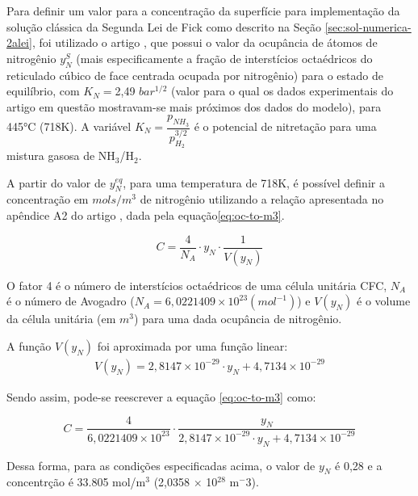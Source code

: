 Para definir um valor para a concentração da superfície para implementação da solução clássica da Segunda Lei de Fick como descrito na Seção \autoref{sec:sol-numerica-2alei}, foi utilizado o artigo  \cite{christiansen2008nitrogen}, que possui o valor da ocupância de átomos de nitrogênio $y_N^{S}$ (mais especificamente a fração de interstícios octaédricos do reticulado cúbico de face centrada ocupada por nitrogênio) para o estado de equilíbrio, com $K_N=$2,49 $bar^{1/2}$ (valor para o qual os dados experimentais do artigo em questão mostravam-se mais próximos dos dados do modelo), para 445°C (718K). A variável $K_N=\dfrac{p_{NH_3}}{p_{H_2}^{3/2}}$ é o potencial de nitretação para uma mistura gasosa de NH$_3$/H$_2$.

A partir do valor de $y_N^{eq}$, para uma temperatura de 718K, é possível definir a concentração em $mols/m^3$ de nitrogênio utilizando a relação apresentada no apêndice A2 do artigo \cite{jespersen2016modelling}, dada pela equação\autoref{eq:oc-to-m3}.

\begin{equation} \label{eq:oc-to-m3}
	C = \dfrac{4}{N_A} \cdot y_N \cdot \dfrac{1}{V(y_N)}
\end{equation}

O fator 4 é o número de interstícios octaédricos de uma célula unitária CFC, $N_A$ é o número de Avogadro ($N_A = 6,0221409 \times 10^{23} (mol^{-1})$) e $V(y_N)$ é o volume da célula unitária (em $m^3$) para uma dada ocupância de nitrogênio.

A função $V(y_N)$ foi aproximada por uma função linear: 
\begin{gather*}
	V(y_N) = 2,8147 \times 10^{-29} \cdot y_N + 4,7134 \times 10^{-29}
\end{gather*}

Sendo assim, pode-se reescrever a equação \autoref{eq:oc-to-m3} como:

\begin{equation} \label{eq:oc-to-m3-full}
	C = \dfrac{4}{6,0221409 \times 10^{23}} \cdot \dfrac{y_N}{2,8147 \times 10^{-29} \cdot y_N + 4,7134 \times 10^{-29}}
\end{equation}

Dessa forma, para as condições especificadas acima, o valor de $y_N$ é 0,28 e a concentrção é 33.805 mol/m$^3$ (2,0358 $\times$ 10$^{28}$ m$^-3$).

\begin{table}[ht]
\centering
\setlength{\doublerulesep}{\arrayrulewidth}
{\def\arraystretch{2}\tabcolsep=10pt
\caption{Parâmetros para concentração na superfície constante}
}
\end{table}

